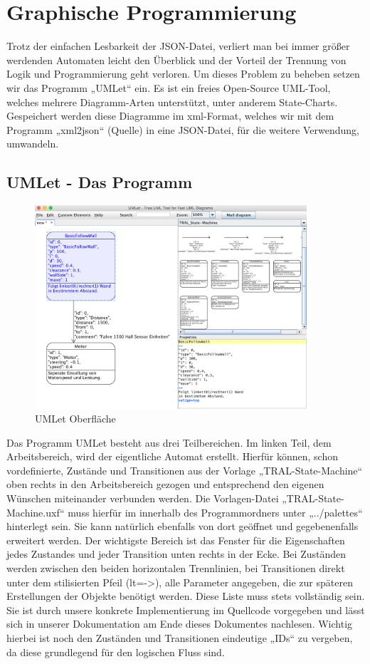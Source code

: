 \section{Graphische Programmierung}
\label{sec:graphischeprogrammierung}

Trotz der einfachen Lesbarkeit der JSON-Datei, verliert man bei immer größer
werdenden Automaten leicht den Überblick und der Vorteil der Trennung von Logik
und Programmierung geht verloren. Um dieses Problem zu beheben setzen wir das
Programm „UMLet“ ein. Es ist ein freies Open-Source UML-Tool, welches mehrere
Diagramm-Arten unterstützt, unter anderem State-Charts. Gespeichert werden
diese Diagramme im xml-Format, welches wir mit dem Programm „xml2json“ (Quelle)
in eine JSON-Datei, für die weitere Verwendung, umwandeln.
\subsection{UMLet - Das Programm}
\begin{figure}[ht]
\centering 
\includegraphics[width=0.90\textwidth]{images/umlet-bsp.png} 
\caption{UMLet Oberfläche}
\label{fig:umlet}
\end{figure}

Das Programm UMLet besteht aus drei Teilbereichen. Im linken Teil, dem
Arbeitsbereich, wird der eigentliche Automat erstellt. Hierfür können, schon
vordefinierte, Zustände und Transitionen aus der Vorlage „TRAL-State-Machine“
oben rechts in den Arbeitsbereich gezogen und entsprechend den eigenen Wünschen
miteinander verbunden werden. Die Vorlagen-Datei „TRAL-State-Machine.uxf“ muss
hierfür im innerhalb des Programmordners unter „../palettes“ hinterlegt sein.
Sie kann natürlich ebenfalls von dort geöffnet und gegebenenfalls erweitert
werden.
Der wichtigste Bereich ist das Fenster für die Eigenschaften jedes Zustandes
und jeder Transition unten rechts in der Ecke.
Bei Zuständen werden zwischen den beiden horizontalen Trennlinien, bei
Transitionen direkt unter dem stilisierten Pfeil (lt=->), alle Parameter
angegeben, die zur späteren Erstellungen der Objekte benötigt werden. Diese
Liste muss stets vollständig sein. Sie ist durch unsere konkrete
Implementierung im Quellcode vorgegeben und lässt sich in unserer Dokumentation
am Ende dieses Dokumentes nachlesen.
Wichtig hierbei ist noch den Zuständen und Transitionen eindeutige „IDs“ zu
vergeben, da diese grundlegend für den logischen Fluss sind.



